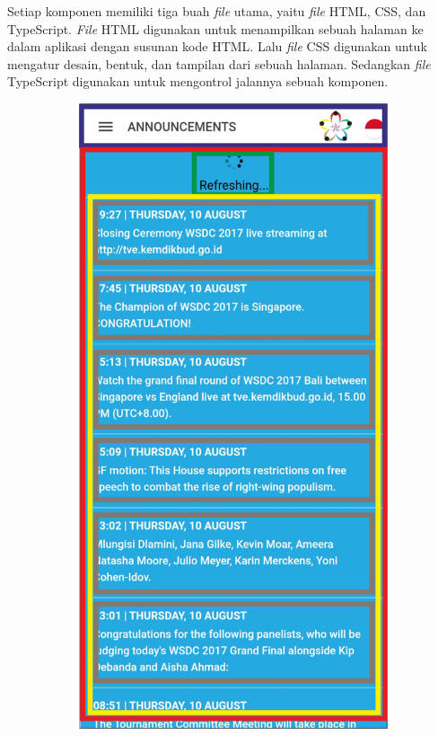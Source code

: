 Setiap komponen memiliki tiga buah \textit{file} utama, yaitu \textit{file} HTML, CSS, dan TypeScript. \textit{File} HTML digunakan untuk menampilkan sebuah halaman ke dalam aplikasi dengan susunan kode HTML. Lalu \textit{file} CSS digunakan untuk mengatur desain, bentuk, dan tampilan dari sebuah halaman. Sedangkan \textit{file} TypeScript digunakan untuk mengontrol jalannya sebuah komponen.


\begin{figure}[H]
     \centering
     \begin{subfigure}[b]{0.21\textwidth}
        \centering
    	\includegraphics[scale=0.4]{Gambar/AnnouncementsPageWireframe.png}

\end{subfigure}
\end{figure}
